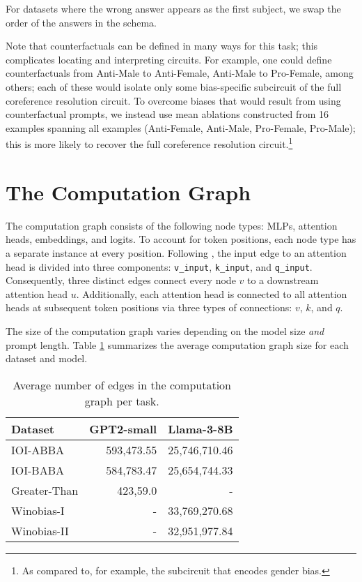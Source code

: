 For datasets where the wrong answer appears as the first subject, we swap the order of the answers in the schema.

Note that counterfactuals can be defined in many ways for this task; this complicates locating and interpreting circuits. For example, one could define counterfactuals from Anti-Male to Anti-Female, Anti-Male to Pro-Female, among others; each of these would isolate only some bias-specific subcircuit of the full coreference resolution circuit. To overcome biases that would result from using counterfactual prompts, we instead use mean ablations constructed from 16 examples spanning all examples (Anti-Female, Anti-Male, Pro-Female, Pro-Male); this is more likely to recover the full coreference resolution circuit.\footnote{As compared to, for example, the subcircuit that encodes gender bias.} 

\section{The Computation Graph} \label{ap:computation_graph}

The computation graph consists of the following node types: MLPs, attention heads, embeddings, and logits. To account for token positions, each node type has a separate instance at every position. Following \citet{wanginterpretability}, the input edge to an attention head is divided into three components: \texttt{v\_input}, \texttt{k\_input}, and \texttt{q\_input}. Consequently, three distinct edges connect every node \(v\) to a downstream attention head \(u\). Additionally, each attention head is connected to all attention heads at subsequent token positions via three types of connections: \(v\), \(k\), and \(q\).

The size of the computation graph varies depending on the model size \emph{and} prompt length. Table \ref{tab:graph_size} summarizes the average computation graph size for each dataset and model.


\begin{table}[!ht]
\centering
\begin{tabular}{lrr}
 \toprule
 Dataset & GPT2-small & Llama-3-8B \\
 \midrule
 IOI-ABBA   & 593,473.55  & 25,746,710.46 \\
 IOI-BABA   & 584,783.47 & 25,654,744.33 \\
 Greater-Than & 423,59.0 & - \\
 Winobias-I & - & 33,769,270.68 \\
 Winobias-II & - & 32,951,977.84 \\
 \bottomrule
\end{tabular}
\caption{Average number of edges in the computation graph per task.}
\label{tab:graph_size}
\end{table}



